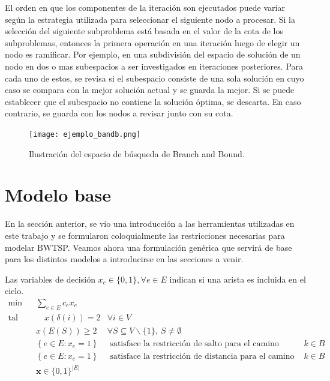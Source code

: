 \documentclass[10pt, a4paper]{article}
\theoremstyle{definition}
\begin{document}
El orden en que los componentes de la iteración son ejecutados puede variar según la estrategia utilizada para seleccionar el siguiente nodo a procesar.
Si la selección del siguiente subproblema está basada en el valor de la cota de los subproblemas, entonces la primera operación en una iteración luego de elegir un nodo es ramificar.
Por ejemplo, en una subdivisión del espacio de solución de un nodo en dos o mas subespacios a ser investigados en iteraciones posteriores.
Para cada uno de estos, se revisa si el subespacio consiste de una sola solución en cuyo caso se compara con la mejor solución actual y se guarda la mejor.
Si se puede establecer que el subespacio no contiene la solución óptima, se descarta. En caso contrario, se guarda con los nodos a revisar junto con su cota.
 
\begin{figure}[H]
  \centering
  \texttt{[image: ejemplo\_bandb.png]}
  \caption{Ilustración del espacio de búsqueda de Branch and Bound.}
  \label{fig:ejemplo_bandb}
\end{figure}

\section{Modelo base}
\label{sec:modelo_base}

En la sección anterior, se vio una introducción a las herramientas utilizadas en este trabajo y se formularon coloquialmente las restricciones necesarias para modelar BWTSP. Veamos ahora una formulación genérica que servirá de base para los distintos modelos a introducirse en las secciones a venir.

Las variables de decisión $x_e \in \{0,1\}, \forall e \in E$ indican si una arista es incluida en el ciclo.
\begin{align} 
	\min & \sum_{e \in E} c_{e} x_{e} & \label{eq:1} \\
	\text {tal que} & \quad x(\delta(i))=2 & \forall i \in V \label{eq:2} \\
	& x(E(S)) \geq 2 & \forall S \subseteq V \backslash\{1\},\ S \neq \emptyset \label{eq:3} \\
	& \left\{e \in E : x_{e}=1\right\} & \text { satisface la restricción de salto para el camino después de cada } k \in B \label{eq:4} \\
	& \left\{e \in E : x_{e}=1\right\} & \text { satisface la restricción de distancia para el camino después de cada } k \in B \label{eq:5} \\
	& \mathbf{x} \in\{0,1\}^{|E|} & \label{eq:6}
\end{align}
\end{document}
